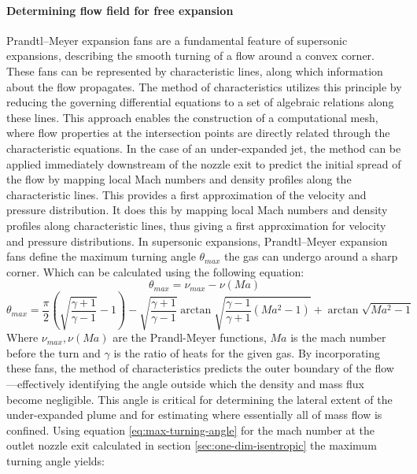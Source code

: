 	\paragraph*{Determining flow field for free expansion}
		Prandtl–Meyer expansion fans are a fundamental feature of supersonic expansions, describing the smooth turning of a flow around a convex corner.
		These fans can be represented by characteristic lines, along which information about the flow propagates.
		The method of characteristics utilizes this principle by reducing the governing differential equations to a set of algebraic relations along these lines.
		This approach enables the construction of a computational mesh, where flow properties at the intersection points are directly related through the characteristic equations.
		In the case of an under-expanded jet, the method can be applied immediately downstream of the nozzle exit to predict the initial spread of the flow by mapping local Mach numbers and density profiles along the characteristic lines.
		This provides a first approximation of the velocity and pressure distribution.
		It does this by mapping local Mach numbers and density profiles along characteristic lines, thus giving 
		a first approximation for velocity and pressure distributions.
		In supersonic expansions, Prandtl–Meyer expansion fans define the maximum turning angle $\theta_{max}$ the gas can undergo around a sharp corner.
		Which can be calculated using the following equation:
		\begin{equation*}
			\theta_{max} = \nu_{max} - \nu(Ma)
		\end{equation*}
		\begin{equation}
			\theta_{max} = \frac{\pi}{2} \left(\sqrt{\frac{\gamma + 1}{\gamma - 1}} - 1\right) - \sqrt{\frac{\gamma + 1}{\gamma - 1}}\arctan{\sqrt{\frac{\gamma - 1}{\gamma + 1}(Ma^2 - 1)}} + \arctan{\sqrt{Ma^2 -1}}
			\label{eq:max-turning-angle}
		\end{equation}
		Where $\nu_{max},\nu(Ma)$ are the Prandl-Meyer functions, $Ma$ is the mach number before the turn and $\gamma$ is the ratio of heats for the given gas.
		By incorporating these fans, the method of characteristics predicts the outer boundary of the flow—effectively identifying the angle outside which the density and mass flux become negligible.
		This angle is critical for determining the lateral extent of the under-expanded plume and for estimating where essentially all of mass flow is confined.
		Using equation \eqref{eq:max-turning-angle} for the mach number at the outlet nozzle exit calculated in section \ref{sec:one-dim-isentropic} the maximum turning angle yields:
